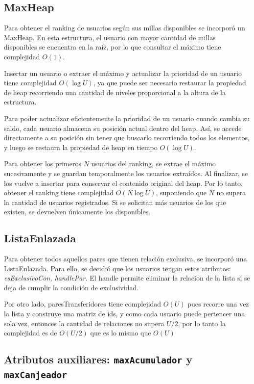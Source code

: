 \documentclass[12pt,a4paper]{article}
\begin{document}
\subsection{MaxHeap}

Para obtener el ranking de usuarios según sus millas disponibles se incorporó un MaxHeap. En esta estructura, el usuario con mayor cantidad de millas disponibles se encuentra en la raíz, por lo que consultar el máximo tiene complejidad $O(1)$.

Insertar un usuario o extraer el máximo y actualizar la prioridad de un usuario tiene complejidad $O(\log U)$, ya que puede ser necesario restaurar la propiedad de heap recorriendo una cantidad de niveles proporcional a la altura de la estructura.

Para poder actualizar eficientemente la prioridad de un usuario cuando cambia su saldo, cada usuario almacena su posición actual dentro del heap. Así, se accede directamente a su posición sin tener que buscarlo recorriendo todos los elementos, y luego se restaura la propiedad de heap en tiempo $O(\log U)$.

Para obtener los primeros $N$ usuarios del ranking, se extrae el máximo sucesivamente y se guardan temporalmente los usuarios extraídos. Al finalizar, se los vuelve a insertar para conservar el contenido original del heap. Por lo tanto, obtener el ranking tiene complejidad $O(N\log U)$, suponiendo que $N$ no supera la cantidad de usuarios registrados. Si se solicitan más usuarios de los que existen, se devuelven únicamente los disponibles.

\subsection{ListaEnlazada}

Para obtener todos aquellos pares que tienen relación exclusiva, se incorporó una ListaEnlazada. Para ello, se decidió que los usuarios tengan estos atributos: \textit{ esExclusivoCon, handlePar.}  El handle permite eliminar la relacion de la lista si se deja de cumplir la condición de exclusividad. 

Por otro lado, paresTransferidores tiene complejidad $O(U)$ pues recorre una vez la lista y construye una matriz de ids, y como cada usuario puede pertencer una sola vez, entonces la cantidad de relaciones no supera $U/2$, por lo tanto la complejidad es de $O(U/2)$ que es lo mismo que $O(U)$

\subsection{Atributos auxiliares: \texttt{maxAcumulador} y \texttt{maxCanjeador}}
\end{document}
